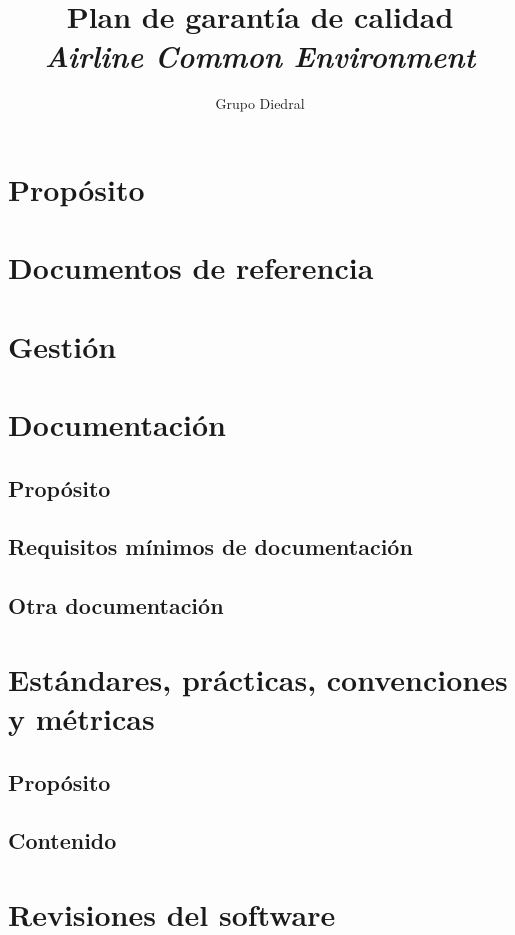 \documentclass[11pt, a4paper, twoside]{report}
\title{Plan de garantía de calidad\\\textsl{Airline Common Environment}}
\author{Grupo Diedral}
\begin{document}

	\tableofcontents
	\newpage
	\thispagestyle{plain}

	\begin{scriptsize}
	\begin{tablacambios}

	\end{tablacambios}
	\end{scriptsize}
	\newpage
	\iniciarnumeraciondiedral
		
	\section{Propósito}
	\section{Documentos de referencia}
	\section{Gestión}
	\section{Documentación}
		\subsection{Propósito}
		\subsection{Requisitos mínimos de documentación}
		\subsection{Otra documentación}
	\section{Estándares, prácticas, convenciones y métricas}
		\subsection{Propósito}
		\subsection{Contenido}
	\section{Revisiones del software}
\end{document}
